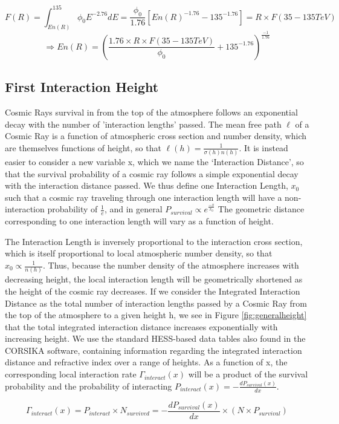\documentclass[11pt]{article}
\begin{document}
\[ F(R) = \int_{En(R)}^{135} \phi_{0} E^{-2.76} dE =\frac{\phi_{0}}{1.76}[En(R)^{-1.76} - 135^{-1.76}]= R \times F(35-135TeV)\] \[\Longrightarrow  En(R) = (\frac{1.76\times R \times F(35-135TeV)}{\phi_{0}} +135^{-1.76})^{\frac{-1}{1.76}} \]

\subsection{First Interaction Height}
Cosmic Rays survival in from the top of the atmosphere follows an exponential decay with the number of 'interaction lengths' passed. The mean free path $\ell$ of a Cosmic Ray is a function of atmospheric cross section and number density, which are themselves functions of  height, so that $\ell(h) = \frac{1}{\sigma(h) n(h)}$. It is instead easier to consider a new variable x, which we name the \textquoteleft Interaction Distance', so that the survival probability of a cosmic ray follows a simple exponential decay with the interaction distance passed. We thus define one Interaction Length, $x_{0}$ such that a cosmic ray traveling through one interaction length will have a non-interaction probability of $\frac{1}{e}$, and in general $P_{survival} \propto e^{\frac{-x}{x_{0}}}$ The geometric distance corresponding to one interaction length will vary as a function of height.

The Interaction Length is inversely proportional to the interaction cross section, which is itself proportional to local atmospheric number density, so that $x_{0} \propto \frac{1}{n(h)}$. Thus, because the number density of the atmosphere increases with decreasing height, the local interaction length will be geometrically shortened as the height of the cosmic ray decreases. If we consider the Integrated Interaction Distance as the total number of interaction lengths passed by a Cosmic Ray from the top of the atmosphere to a given height h, we see in Figure \ref{fig:generalheight} that the total integrated interaction distance increases exponentially with increasing height. We use the standard HESS-based data tables also found in the CORSIKA software, containing information regarding the integrated interaction distance and refractive index over a range of heights. As a function of x, the corresponding local interaction rate $\Gamma_{interact}(x)$ will be a product of the survival probability and the probability of interacting $P_{interact}(x)= -\frac{dP_{survival}(x)}{dx}$. 

\[ \Gamma_{interact}(x) = P_{interact} \times N_{survived} =  - \frac{dP_{survival}(x)}{dx} \times (N \times  P_{survival}) \]
\end{document}
